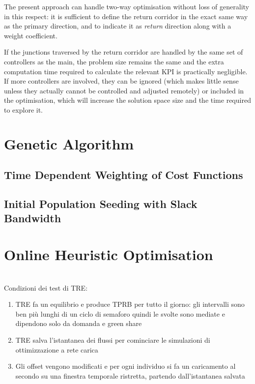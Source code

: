 The present approach can handle two-way optimisation without loss of generality in this respect: it is sufficient to define the return corridor in the exact same way as the primary direction, and to indicate it as \emph{return} direction along with a weight coefficient.

If the junctions traversed by the return corridor are handled by the same set of controllers as the main, the problem size remains the same and the extra computation time required to calculate the relevant KPI is practically negligible. If more controllers are involved, they can be ignored (which makes little sense unless they actually cannot be controlled and adjusted remotely) or included in the optimisation, which will increase the solution space size and the time required to explore it.


\section{Genetic Algorithm}
\subsection{Time Dependent Weighting of Cost Functions}


\subsection{Initial Population Seeding with Slack Bandwidth}




\section{Online Heuristic Optimisation}
\\
Condizioni dei test di TRE:
\begin{enumerate}
\item TRE fa un equilibrio e produce TPRB per tutto il giorno: gli intervalli sono ben più lunghi di un ciclo di semaforo quindi le svolte sono mediate e dipendono solo da domanda e green share
\item TRE salva l'istantanea dei flussi per cominciare le simulazioni di ottimizzazione a rete carica
\item Gli offset vengono modificati e per ogni individuo si fa un caricamento al secondo su una finestra temporale ristretta, partendo dall'istantanea salvata
\end{enumerate}

